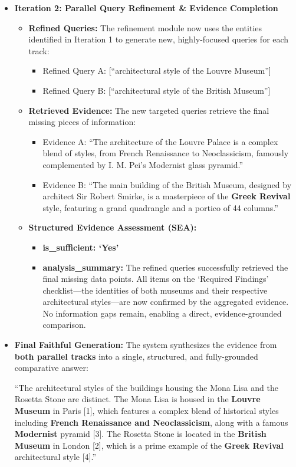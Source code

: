 \documentclass[11pt]{article}
\begin{document}
\begin{itemize}
    \item \textbf{Iteration 2: Parallel Query Refinement \& Evidence Completion}
    \begin{itemize}
        \item \textbf{Refined Queries:} The refinement module now uses the entities identified in Iteration 1 to generate new, highly-focused queries for each track:
        \begin{itemize}
            \item Refined Query A: [``architectural style of the Louvre Museum'']
            \item Refined Query B: [``architectural style of the British Museum'']
        \end{itemize}
        \item \textbf{Retrieved Evidence:} The new targeted queries retrieve the final missing pieces of information:
        \begin{itemize}
            \item Evidence A: ``The architecture of the Louvre Palace is a complex blend of styles, from French Renaissance to Neoclassicism, famously complemented by I. M. Pei's Modernist glass pyramid.''
            \item Evidence B: ``The main building of the British Museum, designed by architect Sir Robert Smirke, is a masterpiece of the \textbf{Greek Revival} style, featuring a grand quadrangle and a portico of 44 columns.''
        \end{itemize}
        \item \textbf{Structured Evidence Assessment (SEA):}
        \begin{itemize}
            \item \textbf{is\_sufficient: `Yes'}
            \item \textbf{analysis\_summary:} The refined queries successfully retrieved the final missing data points. All items on the `Required Findings' checklist---the identities of both museums and their respective architectural styles---are now confirmed by the aggregated evidence. No information gaps remain, enabling a direct, evidence-grounded comparison.
        \end{itemize}
    \end{itemize}
    
    \item \textbf{Final Faithful Generation:}
    The system synthesizes the evidence from \textbf{both parallel tracks} into a single, structured, and fully-grounded comparative answer:
    
    ``The architectural styles of the buildings housing the Mona Lisa and the Rosetta Stone are distinct. The Mona Lisa is housed in the \textbf{Louvre Museum} in Paris [1], which features a complex blend of historical styles including \textbf{French Renaissance and Neoclassicism}, along with a famous \textbf{Modernist} pyramid [3]. The Rosetta Stone is located in the \textbf{British Museum} in London [2], which is a prime example of the \textbf{Greek Revival} architectural style [4].''
\end{itemize}
\end{document}
